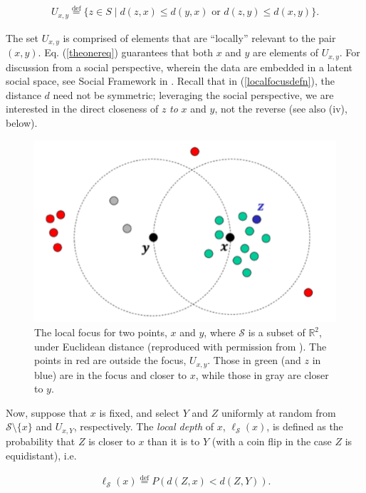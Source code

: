 \begin{eqnarray}
U_{x,y} \stackrel{\text{def}}{=} \{ z \in S \mid d(z,x) \leq d(y,x) \text{ or } d(z,y) \leq d(x,y) \}. \label{localfocusdefn}
\end{eqnarray}

\noindent The set \(U_{x,y}\) is comprised of elements that are ``locally'' relevant to the pair \((x,y)\). Eq. (\ref{theonereq}) guarantees that both \(x\) and \(y\) are elements of \(U_{x,y}\). For discussion from a social perspective, wherein the data are embedded in a latent social space, see Social Framework in \citet{berenhaut2022social}. Recall that in (\ref{localfocusdefn}), the distance \(d\) need not be symmetric; leveraging the social perspective, we are interested in the direct closeness of \(z\) \emph{to} \(x\) and \(y\), not the reverse (see also (iv), below).

\begin{figure}[H]
    \centering
\includegraphics[width=.6\linewidth,trim={2cm 1.2cm 2cm 1cm},clip]{pald-1}

\caption{The local focus for two points, $x$ and $y$, where $\mathcal{S}$ is a subset of $\mathbb{R}^2$, under Euclidean distance (reproduced with permission from \citet{berenhaut2024generalized}). The points in red are outside the focus, $U_{x,y}$. Those in green (and $z$ in blue) are in the focus and closer to $x$, while those in gray are closer to $y$.}\label{fig:paldmethod}
\end{figure}

Now, suppose that \(x\) is fixed, and select \(Y\) and \(Z\) uniformly at random from \(\mathcal{S}\setminus \{x\}\) and \(U_{x,Y}\), respectively. The \emph{local depth} of \(x\), \(\ell_{\mathcal{S}}(x)\), is defined as the probability that \(Z\) is closer to \(x\) than it is to \(Y\) (with a coin flip in the case \(Z\) is equidistant), i.e.

\begin{eqnarray}
\ell_{\mathcal{S}}(x)\stackrel{\mathrm{def}}{=}P(d(Z,x) < d(Z,Y)) \label{localdepthdefn}.
\end{eqnarray}

